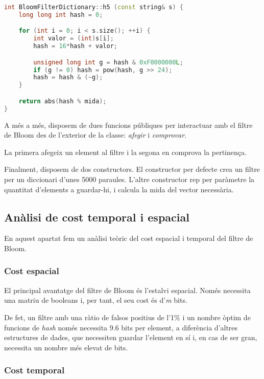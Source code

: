 \documentclass[titlepage]{article}
\begin{document}
\begin{lstlisting}[language=C++, caption=Segon tipus de funció de hash]
int BloomFilterDictionary::h5 (const string& s) {
    long long int hash = 0;

    for (int i = 0; i < s.size(); ++i) {
        int valor = (int)s[i];
        hash = 16*hash + valor;

        unsigned long int g = hash & 0xF0000000L;
		if (g != 0) hash = pow(hash, g >> 24);
		hash = hash & (~g);
    }

    return abs(hash % mida);
}
\end{lstlisting}

A més a més, disposem de dues funcions públiques per interactuar amb el filtre de Bloom des de l'exterior de la classe: \textit{afegir} i \textit{comprovar}.
\newline\par
La primera afegeix un element al filtre i la segona en comprova la pertinença.
\newline\par
Finalment, disposem de dos constructors. El constructor per defecte crea un filtre per un diccionari d'unes 5000 paraules. L'altre constructor rep per paràmetre la quantitat d'elements a guardar-hi, i calcula la mida del vector necessària. 

\subsection{Anàlisi de cost temporal i espacial}
En aquest apartat fem un anàlisi teòric del cost espacial i temporal del filtre de Bloom.

\subsubsection{Cost espacial}
El principal avantatge del filtre de Bloom és l'estalvi espacial. Només necessita una matriu de booleans i, per tant, el seu cost és d'\textit{m} bits. 
\newline\par
De fet, un filtre amb una ràtio de falsos positius de l'1\% i un nombre òptim de funcions de \textit{hash} només necessita 9.6 bits per element, a diferència d'altres estructures de dades, que necessiten guardar l'element en sí i, en cas de ser gran, necessita un nombre més elevat de bits.

\subsubsection{Cost temporal}
\end{document}
